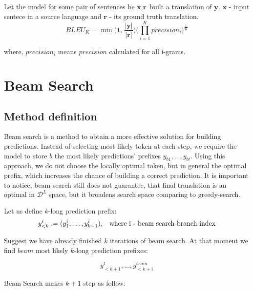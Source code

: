 \documentclass[a4paper,14pt]{extarticle}
\begin{document}
	Let the model for some pair of sentences be $\textbf{x}, \textbf{r}$ built a translation of $\textbf{y}$. $\textbf{x}$ - input sentece in a source language and $\textbf{r}$ - its ground truth translation.
	\begin{equation}
		BLEU_K = \min\Big(1, \, \frac{|\textbf{y}|}{|\textbf{r}|}\Big) \big(\prod_{i=1}^{K} precision_i\big)^{\frac1K}
	\end{equation}

	where, $precision_i$ means $precision$ calculated for all i-grams.
	
	\section{Beam Search}
	\subsection{Method definition}
	
	Beam search is a method to obtain a more effective solution for building predictions. Instead of selecting most likely token at each step, we require the model to store $b$ the most likely predictions' prefixes $y_{b1}, \dots, y_{bt}$. Using this approach, we do not choose the locally optimal token, but in general the optimal prefix, which increases the chance of building a correct prediction. It is important to notice, beam search still does not guarantee, that final translation is an optimal in $\mathcal{D}^L$ space, but it broadens search space comparing to greedy-search.
	
	Let us define $k$-long prediction prefix:
	\begin{equation}
		y_{<k}^{i} := (y_1^{i}, \dots, y_{k-1}^{i}) \text{, \,\, where i - beam search branch index}
	\end{equation}
	
	Suggest we have already finished $k$ iterations of beam search. At that moment we find $beam$ most likely $k$-long prediction prefixes:
	
	\begin{equation*}
		y_{<k+1}^1, \dots, y_{<k+1}^{beam}
	\end{equation*}
	
	Beam Search makes $k+1$ step as follow:
	
\end{document}
